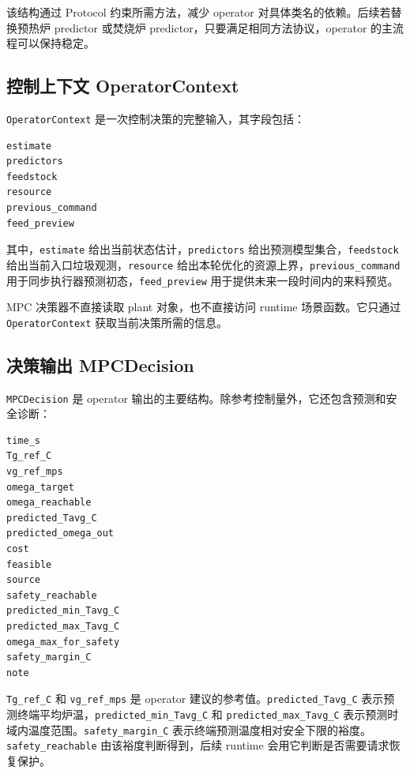 \documentclass[UTF8,openany,zihao=-4,oneside]{ctexbook}
\providecommand{\passthrough}[1]{#1}
\begin{document}
该结构通过 Protocol 约束所需方法，减少 operator 对具体类名的依赖。后续若替换预热炉 predictor 或焚烧炉 predictor，只要满足相同方法协议，operator 的主流程可以保持稳定。

\subsection{控制上下文 OperatorContext}\label{subsec:operator-context}

\passthrough{\lstinline!OperatorContext!} 是一次控制决策的完整输入，其字段包括：

\begin{lstlisting}
estimate
predictors
feedstock
resource
previous_command
feed_preview
\end{lstlisting}

其中，\passthrough{\lstinline!estimate!} 给出当前状态估计，\passthrough{\lstinline!predictors!} 给出预测模型集合，\passthrough{\lstinline!feedstock!} 给出当前入口垃圾观测，\passthrough{\lstinline!resource!} 给出本轮优化的资源上界，\passthrough{\lstinline!previous_command!} 用于同步执行器预测初态，\passthrough{\lstinline!feed_preview!} 用于提供未来一段时间内的来料预览。

MPC 决策器不直接读取 plant 对象，也不直接访问 runtime 场景函数。它只通过 \passthrough{\lstinline!OperatorContext!} 获取当前决策所需的信息。

\subsection{决策输出 MPCDecision}\label{subsec:mpc-decision-type}

\passthrough{\lstinline!MPCDecision!} 是 operator 输出的主要结构。除参考控制量外，它还包含预测和安全诊断：

\begin{lstlisting}
time_s
Tg_ref_C
vg_ref_mps
omega_target
omega_reachable
predicted_Tavg_C
predicted_omega_out
cost
feasible
source
safety_reachable
predicted_min_Tavg_C
predicted_max_Tavg_C
omega_max_for_safety
safety_margin_C
note
\end{lstlisting}

\passthrough{\lstinline!Tg_ref_C!} 和 \passthrough{\lstinline!vg_ref_mps!} 是 operator 建议的参考值。\passthrough{\lstinline!predicted_Tavg_C!} 表示预测终端平均炉温，\passthrough{\lstinline!predicted_min_Tavg_C!} 和 \passthrough{\lstinline!predicted_max_Tavg_C!} 表示预测时域内温度范围。\passthrough{\lstinline!safety_margin_C!} 表示终端预测温度相对安全下限的裕度。\passthrough{\lstinline!safety_reachable!} 由该裕度判断得到，后续 runtime 会用它判断是否需要请求恢复保护。
\end{document}
